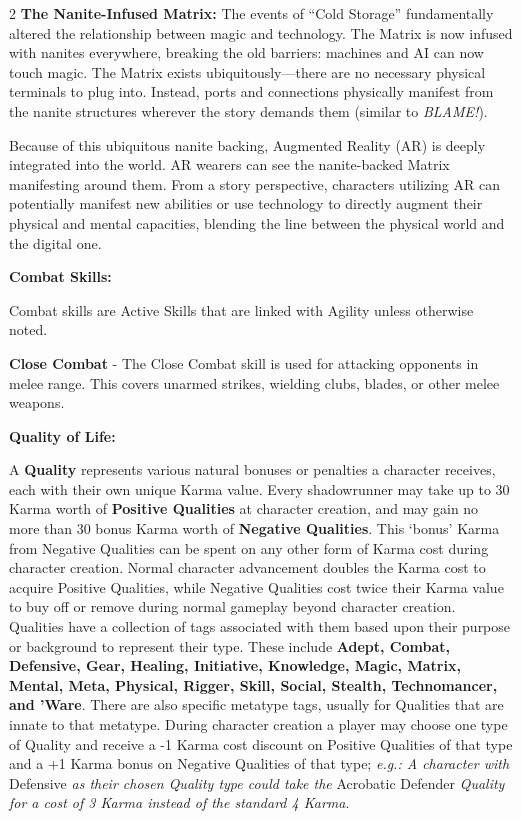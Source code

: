 \documentclass[
  oneside]{article}
\begin{document}
\begin{multicols}{2}
\textbf{The Nanite-Infused Matrix:} The events of
``Cold Storage'' fundamentally altered the
relationship between magic and technology. The
Matrix is now infused with nanites everywhere,
breaking the old barriers: machines and AI can now
touch magic. The Matrix exists
ubiquitously---there are no necessary physical
terminals to plug into. Instead, ports and
connections physically manifest from the nanite
structures wherever the story demands them
(similar to \emph{BLAME!}).

Because of this ubiquitous nanite backing,
Augmented Reality (AR) is deeply integrated into
the world. AR wearers can see the nanite-backed
Matrix manifesting around them. From a story
perspective, characters utilizing AR can
potentially manifest new abilities or use
technology to directly augment their physical and
mental capacities, blending the line between the
physical world and the digital one.

\textbf{Combat Skills:}

Combat skills are Active Skills that are linked
with Agility unless otherwise noted.

\textbf{Close Combat} - The Close Combat skill is
used for attacking opponents in melee range. This
covers unarmed strikes, wielding clubs, blades, or
other melee weapons.

\textbf{Quality of Life:}

A \textbf{Quality} represents various natural
bonuses or penalties a character receives, each
with their own unique Karma value. Every
shadowrunner may take up to 30 Karma worth of
\textbf{Positive Qualities} at character creation,
and may gain no more than 30 bonus Karma worth of
\textbf{Negative Qualities}. This `bonus' Karma
from Negative Qualities can be spent on any other
form of Karma cost during character creation.
Normal character advancement doubles the Karma
cost to acquire Positive Qualities, while Negative
Qualities cost twice their Karma value to buy off
or remove during normal gameplay beyond character
creation.\\
Qualities have a collection of tags associated
with them based upon their purpose or background
to represent their type. These include
\textbf{Adept, Combat, Defensive, Gear, Healing,
Initiative, Knowledge, Magic, Matrix, Mental,
Meta, Physical, Rigger, Skill, Social, Stealth,
Technomancer, and 'Ware}. There are also specific
metatype tags, usually for Qualities that are
innate to that metatype. During character creation
a player may choose one type of Quality and
receive a -1 Karma cost discount on Positive
Qualities of that type and a +1 Karma bonus on
Negative Qualities of that type; \emph{e.g.: A
character with} Defensive \emph{as their chosen
Quality type could take the} Acrobatic Defender
\emph{Quality for a cost of 3 Karma instead of the
standard 4 Karma}.


\end{multicols}
\end{document}
